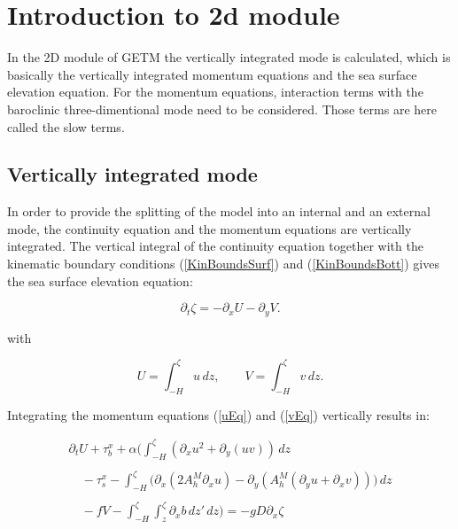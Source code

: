 \section{Introduction to 2d module}

In the 2D module of GETM the vertically integrated mode is calculated,
which is basically the vertically integrated momentum equations and the
sea surface elevation equation. For the momentum equations, interaction terms
with the baroclinic three-dimentional mode need to be considered. Those terms
are here called the slow terms.

\subsection{Vertically integrated mode}\label{SectionVerticalIntegrated}

In order to provide the splitting of the model into
an internal and an external mode, the continuity equation and
the momentum equations are vertically integrated.
The vertical integral of the continuity equation together
with the kinematic boundary conditions (\ref{KinBoundsSurf}) and
(\ref{KinBoundsBott}) gives the sea surface elevation equation:

\begin{equation}\label{Elevation}
\partial_t \zeta = - \partial_x U- \partial_y V.
\end{equation}

with
 
\begin{equation}
U=\int_{-H}^{\zeta} u\,dz,\qquad V=\int_{-H}^{\zeta} v\,dz.
\end{equation}

Integrating the momentum equations (\ref{uEq}) and (\ref{vEq}) vertically
results in:

\begin{equation}\label{Uint}
\begin{array}{l}
\displaystyle
\partial_tU+
\tau_b^x+\alpha\bigg(\int_{-H}^{\zeta}
\left(\partial_x u^2+\partial_y(uv)\right)\,dz\\
\\
\displaystyle
\quad-\tau^x_s
-\int_{-H}^{\zeta}\big(
\partial_x\left(2A_h^M\partial_xu\right)-\partial_y\left(A_h^M
(\partial_yu+\partial_xv)\right)\big)\,dz
\\ \\
\displaystyle
\quad -fV
-\int_{-H}^{\zeta}\int_z^{\zeta}\partial_x b\,dz'\,dz \bigg)
=
-gD\partial_x\zeta
\end{array}
\end{equation}

